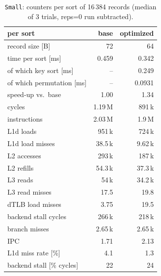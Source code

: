 \begin{table}[htbp]\centering\small
\begin{tabular}{lrr}
\toprule
per sort & base & optimized \\
\midrule
record size [B] & 72 & 64 \\
time per sort [ms] & 0.459 & 0.342 \\
\quad of which key sort [ms] & -- & 0.249 \\
\quad of which permutation [ms] & -- & 0.0931 \\
speed-up vs.\ base & 1.00 & 1.34 \\
cycles & 1.19\,M & 891\,k \\
instructions & 2.03\,M & 1.9\,M \\
L1d loads & 951\,k & 724\,k \\
L1d load misses & 38.5\,k & 9.62\,k \\
L2 accesses & 293\,k & 187\,k \\
L2 refills & 54.3\,k & 37.3\,k \\
L3 reads & 54\,k & 34.2\,k \\
L3 read misses & 17.5 & 19.8 \\
dTLB load misses & 3.75 & 19.5 \\
backend stall cycles & 266\,k & 218\,k \\
branch misses & 2.65\,k & 2.65\,k \\
IPC & 1.71 & 2.13 \\
L1d miss rate [\%] & 4.1 & 1.3 \\
backend stall [\% cycles] & 22 & 24 \\
\bottomrule
\end{tabular}
\caption{\texttt{Small}: counters per sort of 16\,384 records (median of 3 trials, reps=0 run subtracted).}\label{tab:small16384}
\end{table}
